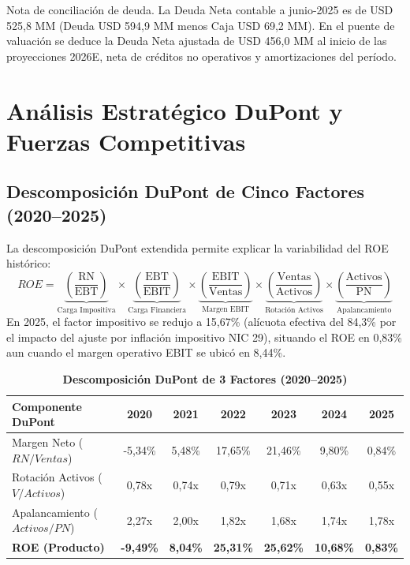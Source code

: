 \documentclass[11pt,a4paper]{article}
\begin{document}
\noindent
{\tiny Nota de conciliación de deuda. La Deuda Neta contable a junio-2025 es de USD 525,8 MM (Deuda USD 594,9 MM menos Caja USD 69,2 MM). En el puente de valuación se deduce la Deuda Neta ajustada de USD 456,0 MM al inicio de las proyecciones 2026E, neta de créditos no operativos y amortizaciones del período.\par}

\section{Análisis Estratégico DuPont y Fuerzas Competitivas}

\subsection{Descomposición DuPont de Cinco Factores (2020--2025)}
La descomposición DuPont extendida permite explicar la variabilidad del ROE histórico:
\begin{equation}
    ROE = \underbrace{\left(\frac{\text{RN}}{\text{EBT}}\right)}_{\text{Carga Impositiva}} \times \underbrace{\left(\frac{\text{EBT}}{\text{EBIT}}\right)}_{\text{Carga Financiera}} \times \underbrace{\left(\frac{\text{EBIT}}{\text{Ventas}}\right)}_{\text{Margen EBIT}} \times \underbrace{\left(\frac{\text{Ventas}}{\text{Activos}}\right)}_{\text{Rotación Activos}} \times \underbrace{\left(\frac{\text{Activos}}{\text{PN}}\right)}_{\text{Apalancamiento}}
\end{equation}
En 2025, el factor impositivo se redujo a 15,67\% (alícuota efectiva del 84,3\% por el impacto del ajuste por inflación impositivo NIC 29), situando el ROE en 0,83\% aun cuando el margen operativo EBIT se ubicó en 8,44\%.

\begin{table}[H]
\centering
\caption{\textbf{Descomposición DuPont de 3 Factores (2020--2025)}}
\small
\begin{tabularx}{\textwidth}{Xcccccc}
\toprule
\textbf{Componente DuPont} & \textbf{2020} & \textbf{2021} & \textbf{2022} & \textbf{2023} & \textbf{2024} & \textbf{2025} \\
\midrule
Margen Neto ($RN / Ventas$) & -5,34\% & 5,48\% & 17,65\% & 21,46\% & 9,80\% & 0,84\% \\
Rotación Activos ($V / Activos$) & 0,78x & 0,74x & 0,79x & 0,71x & 0,63x & 0,55x \\
Apalancamiento ($Activos / PN$) & 2,27x & 2,00x & 1,82x & 1,68x & 1,74x & 1,78x \\
\midrule
\textbf{ROE (Producto)} & \textbf{-9,49\%} & \textbf{8,04\%} & \textbf{25,31\%} & \textbf{25,62\%} & \textbf{10,68\%} & \textbf{0,83\%} \\
\bottomrule
\end{tabularx}
\end{table}
\end{document}
